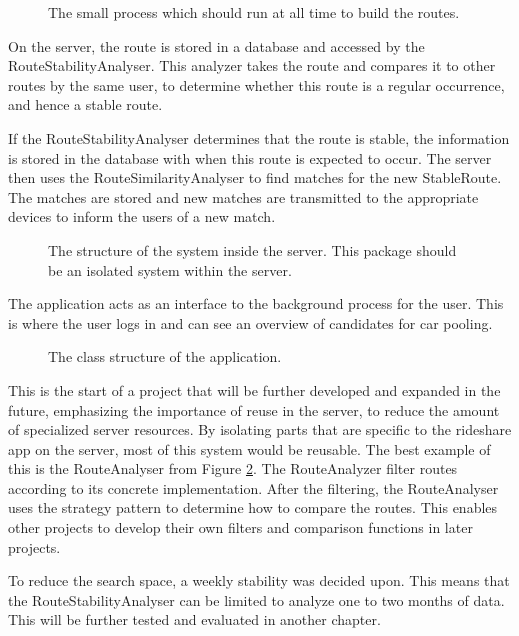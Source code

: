 \begin{figure}[h]
	\centering
	
	\caption{The small process which should run at all time to build the routes.}
	\label{fig:classDiagramSprint1Observer}
\end{figure}


On the server, the route is stored in a database and accessed by the RouteStabilityAnalyser.
This analyzer takes the route and compares it to other routes by the same user, to determine whether this route is a regular occurrence, and hence a stable route.

If the RouteStabilityAnalyser determines that the route is stable, the information is stored in the database with when this route is expected to occur.
The server then uses the RouteSimilarityAnalyser to find matches for the new  StableRoute.
The matches are stored and new matches are transmitted to the appropriate devices to inform the users of a new match.

\begin{figure}[h]
	\centering
	
	\caption{The structure of the system inside the server. This package should be an isolated system within the server.}
	\label{fig:classDiagramSprint1Server}
\end{figure}

The application acts as an interface to the background process for the user.
This is where the user logs in and can see an overview of candidates for car pooling.

\begin{figure}[h]
	\centering
	
	\caption{The class structure of the application.}
	\label{fig:classDiagramSprint1Application}
\end{figure}

This is the start of a project that will be further developed and expanded in the future, emphasizing the importance of reuse in the server, to reduce the amount of specialized server resources.
By isolating parts that are specific to the rideshare app on the server, most of this system would be reusable.
The best example of this is the RouteAnalyser from Figure \ref{fig:classDiagramSprint1Server}.
The RouteAnalyzer filter routes according to its concrete implementation.
After the filtering, the RouteAnalyser uses the strategy pattern to determine how to compare the routes.
This enables other projects to develop their own filters and comparison functions in later projects.

To reduce the search space, a weekly stability was decided upon. 
This means that the RouteStabilityAnalyser can be limited to analyze one to two months of data.
This will be further tested and evaluated in another chapter. 